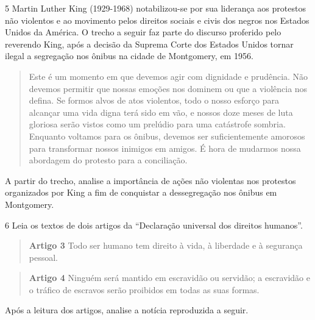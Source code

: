 \num{5} Martin Luther King (1929-1968) notabilizou-se por sua liderança
aos protestos não violentos e ao movimento pelos direitos sociais e
civis dos negros nos Estados Unidos da América. O trecho a seguir faz
parte do discurso proferido pelo reverendo King, após a decisão da
Suprema Corte dos Estados Unidos tornar ilegal a segregação nos ônibus
na cidade de Montgomery, em 1956.

\begin{quote}
Este é um momento em que devemos agir com dignidade e prudência. Não
devemos permitir que nossas emoções nos dominem ou que a violência nos
defina. Se formos alvos de atos violentos, todo o nosso esforço para
alcançar uma vida digna terá sido em vão, e nossos doze meses de luta
gloriosa serão vistos como um prelúdio para uma catástrofe sombria.
Enquanto voltamos para os ônibus, devemos ser suficientemente amorosos
para transformar nossos inimigos em amigos. É hora de mudarmos nossa
abordagem do protesto para a conciliação.
\end{quote}

A partir do trecho, analise a importância de ações não violentas nos
protestos organizados por King a fim de conquistar a dessegregação nos
ônibus em Montgomery.


\num{6} Leia os textos de dois artigos da ``Declaração universal dos
direitos humanos''.

\begin{quote}
\textbf{Artigo 3} Todo ser humano tem direito à vida, à liberdade e à
segurança pessoal.
\end{quote}

\begin{quote}
\textbf{Artigo 4} Ninguém será mantido em escravidão ou servidão; a
escravidão e o tráfico de escravos serão proibidos em todas as suas
formas.
\end{quote}

Após a leitura dos artigos, analise a notícia reproduzida a seguir.

